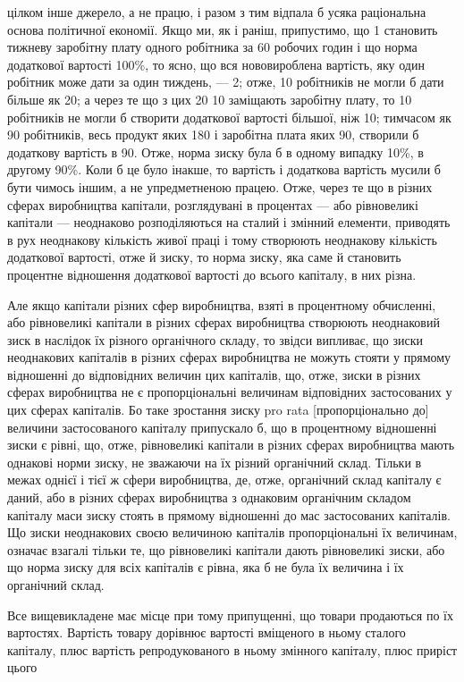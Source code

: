 \parcont{}  %
цілком інше джерело, а не працю, і разом з тим відпала б
усяка раціональна основа політичної економії. Якщо ми, як і раніш, припустимо, що 1
становить тижневу заробітну плату одного робітника за 60 робочих годин і що норма
додаткової вартості \deq{} 100\%, то ясно, що вся нововироблена
вартість, яку один робітник може дати за один тиждень, — 2; отже, 10 робітників не
могли б дати більше як
20; а через те що з цих 20
10 заміщають заробітну плату, то 10 робітників не могли б створити додаткової
вартості більшої, ніж
10; тимчасом як 90 робітників, весь продукт
яких \deq{} 180 і заробітна плата яких \deq{} 90, створили б додаткову
вартість в 90. Отже, норма зиску була б в одному випадку 10\%, в другому 90\%. Коли
б це було інакше, то вартість і додаткова
вартість мусили б бути чимось іншим, а не упредметненою
працею. Отже, через те що в різних сферах виробництва капітали, розглядувані в процентах — або
рівновеликі капітали —
неоднаково розподіляються на сталий і змінний елементи, приводять в рух неоднакову кількість живої
праці і тому створюють
неоднакову кількість додаткової вартості, отже й зиску, то
норма зиску, яка саме й становить процентне відношення додаткової вартості до всього капіталу, в них
різна.

Але якщо капітали різних сфер виробництва, взяті в процентному обчисленні, або рівновеликі капітали
в різних сферах
виробництва створюють неоднаковий зиск в наслідок їх різного
органічного складу, то звідси випливає, що зиски неоднакових
капіталів в різних сферах виробництва не можуть стояти у
прямому відношенні до відповідних величин цих капіталів,
що, отже, зиски в різних сферах виробництва не є пропорціональні величинам відповідних застосованих
у цих сферах капіталів. Бо таке зростання зиску pro rata [пропорціонально до] величини застосованого
капіталу припускало б, що в процентному відношенні зиски є рівні, що, отже, рівновеликі капітали
в різних сферах виробництва мають однакові норми зиску, не
зважаючи на їх різний органічний склад. Тільки в межах однієї
і тієї ж сфери виробництва, де, отже, органічний склад капіталу є даний, або в різних сферах
виробництва з однаковим
органічним складом капіталу маси зиску стоять в прямому відношенні до мас застосованих капіталів. Що
зиски неоднакових
своєю величиною капіталів пропорціональні їх величинам, означає
взагалі тільки те, що рівновеликі капітали дають рівновеликі
зиски, або що норма зиску для всіх капіталів є рівна, яка б
не була їх величина і їх органічний склад.

Все вищевикладене має місце при тому припущенні, що товари продаються по їх вартостях. Вартість
товару дорівнює
вартості вміщеного в ньому сталого капіталу, плюс вартість
репродукованого в ньому змінного капіталу, плюс приріст цього
\parbreak{}  %
